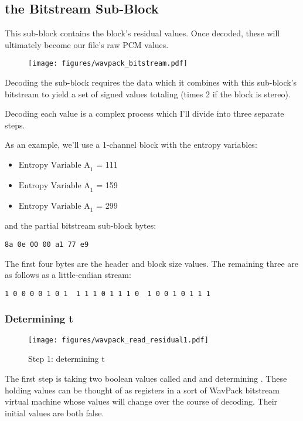 \clearpage
\subsection{the Bitstream Sub-Block}
This sub-block contains the block's residual values.
Once decoded, these will ultimately become our file's raw PCM values.
\begin{figure}[h]
\texttt{[image: figures/wavpack\_bitstream.pdf]}
\end{figure}
\par
\noindent

Decoding the  sub-block requires the 
data which it combines with this sub-block's bitstream to yield a set of signed
values totaling  (times 2 if the block is stereo).

Decoding each value is a complex process which I'll divide into
three separate steps.

As an example, we'll use a 1-channel block with the entropy variables:
\begin{itemize}
\item $\text{Entropy Variable A}_1$ = 111
\item $\text{Entropy Variable A}_1$ = 159
\item $\text{Entropy Variable A}_1$ = 299
\end{itemize}
and the partial bitstream sub-block bytes:
\begin{Verbatim}[frame=single]
8a 0e 00 00 a1 77 e9
\end{Verbatim}
The first four bytes are the header and block size values.
The remaining three are as follows as a little-endian stream:
\begin{Verbatim}[frame=single]
1 0 0 0 0 1 0 1  1 1 1 0 1 1 1 0  1 0 0 1 0 1 1 1
\end{Verbatim}

\clearpage
\subsubsection{Determining t}
\begin{wrapfigure}[37]{r}{3in}
\texttt{[image: figures/wavpack\_read\_residual1.pdf]}
\caption{Step 1: determining t}
\end{wrapfigure}
The first step is taking two boolean values called
 and  and determining .
These holding values can be thought of as registers in a sort of
WavPack bitstream virtual machine whose values will
change over the course of decoding.
Their initial values are both false.

